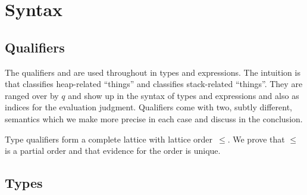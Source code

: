 \documentclass[sigplan,review,dvipsnames,screen,10pt]{acmart}
\begin{document}

\section{Syntax}
\label{sec:syntax}

\subsection{Qualifiers}
\label{sec:qualifiers}

The qualifiers {\AOne} and {\ATwo} are used throughout in types and
expressions. The intuition is that {\AOne} classifies heap-related ``things'' and {\ATwo} classifies
stack-related ``things''.  They are ranged over by $q$ and show up in the syntax of
types and expressions and also as indices for the evaluation
judgment. Qualifiers come with two, subtly different, semantics which
we make more precise in each case and discuss in the conclusion.
\Qual

Type qualifiers form a complete lattice with lattice order~$\le$. We
prove that $\le$ is a partial order and that evidence for the order is unique.

\subsection{Types}
\label{sec:types}
\end{document}
